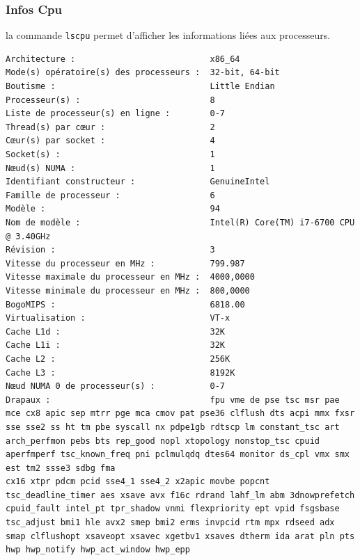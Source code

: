 \documentclass[11pt]{article}
\theoremstyle{definition}
\theoremstyle{definition}
\theoremstyle{definition}
\theoremstyle{theorem}
\theoremstyle{definition}
\begin{document}
\subsubsection {Infos Cpu}
la commande \texttt{lscpu} permet d'afficher les informations liées aux processeurs.
\begin{lstlisting}[columns=fixed,basicstyle=\scriptsize\ttfamily]
Architecture :                           x86_64
Mode(s) opératoire(s) des processeurs :  32-bit, 64-bit
Boutisme :                               Little Endian
Processeur(s) :                          8
Liste de processeur(s) en ligne :        0-7
Thread(s) par cœur :                     2
Cœur(s) par socket :                     4
Socket(s) :                              1
Nœud(s) NUMA :                           1
Identifiant constructeur :               GenuineIntel
Famille de processeur :                  6
Modèle :                                 94
Nom de modèle :                          Intel(R) Core(TM) i7-6700 CPU @ 3.40GHz
Révision :                               3
Vitesse du processeur en MHz :           799.987
Vitesse maximale du processeur en MHz :  4000,0000
Vitesse minimale du processeur en MHz :  800,0000
BogoMIPS :                               6818.00
Virtualisation :                         VT-x
Cache L1d :                              32K
Cache L1i :                              32K
Cache L2 :                               256K
Cache L3 :                               8192K
Nœud NUMA 0 de processeur(s) :           0-7
Drapaux :                                fpu vme de pse tsc msr pae mce cx8 apic sep mtrr pge mca cmov pat pse36 clflush dts acpi mmx fxsr sse sse2 ss ht tm pbe syscall nx pdpe1gb rdtscp lm constant_tsc art arch_perfmon pebs bts rep_good nopl xtopology nonstop_tsc cpuid aperfmperf tsc_known_freq pni pclmulqdq dtes64 monitor ds_cpl vmx smx est tm2 ssse3 sdbg fma
cx16 xtpr pdcm pcid sse4_1 sse4_2 x2apic movbe popcnt tsc_deadline_timer aes xsave avx f16c rdrand lahf_lm abm 3dnowprefetch cpuid_fault intel_pt tpr_shadow vnmi flexpriority ept vpid fsgsbase tsc_adjust bmi1 hle avx2 smep bmi2 erms invpcid rtm mpx rdseed adx smap clflushopt xsaveopt xsavec xgetbv1 xsaves dtherm ida arat pln pts hwp hwp_notify hwp_act_window hwp_epp
\end{lstlisting}

\printbibliography
\end{document}

